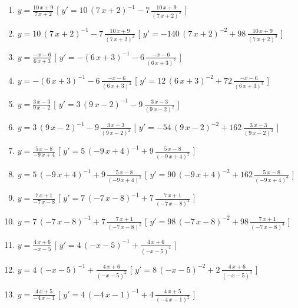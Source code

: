 \begin{esercizio}
\begin{enumerate}
\item $y= {\frac {10\,x+9}{7\,x+2}} $ \hfill [ $y'= 10\, \left( 7\,x+2 \right) ^{-1}-7\,{\frac {10\,x+9}{ \left( 7\,x+2 \right) ^{2}}}$ ]
\item $y= 10\, \left( 7\,x+2 \right) ^{-1}-7\,{\frac {10\,x+9}{ \left( 7\,x+2 \right) ^{2}}} $ \hfill [ $y'= -140\, \left( 7\,x+2 \right) ^{-2}+98\,{\frac {10\,x+9}{ \left( 7\,x+2 \right) ^{3}}}$ ]
\item $y= {\frac {-x-6}{6\,x+3}} $ \hfill [ $y'= - \left( 6\,x+3 \right) ^{-1}-6\,{\frac {-x-6}{ \left( 6\,x+3 \right) ^{2}}}$ ]
\item $y= - \left( 6\,x+3 \right) ^{-1}-6\,{\frac {-x-6}{ \left( 6\,x+3 \right) ^{2}}} $ \hfill [ $y'= 12\, \left( 6\,x+3 \right) ^{-2}+72\,{\frac {-x-6}{ \left( 6\,x+3 \right) ^{3}}}$ ]
\item $y= {\frac {3\,x-3}{9\,x-2}} $ \hfill [ $y'= 3\, \left( 9\,x-2 \right) ^{-1}-9\,{\frac {3\,x-3}{ \left( 9\,x-2 \right) ^{2}}}$ ]
\item $y= 3\, \left( 9\,x-2 \right) ^{-1}-9\,{\frac {3\,x-3}{ \left( 9\,x-2 \right) ^{2}}} $ \hfill [ $y'= -54\, \left( 9\,x-2 \right) ^{-2}+162\,{\frac {3\,x-3}{ \left( 9\,x-2 \right) ^{3}}}$ ]
\item $y= {\frac {5\,x-8}{-9\,x+4}} $ \hfill [ $y'= 5\, \left( -9\,x+4 \right) ^{-1}+9\,{\frac {5\,x-8}{ \left( -9\,x+4 \right) ^{2}}}$ ]
\item $y= 5\, \left( -9\,x+4 \right) ^{-1}+9\,{\frac {5\,x-8}{ \left( -9\,x+4 \right) ^{2}}} $ \hfill [ $y'= 90\, \left( -9\,x+4 \right) ^{-2}+162\,{\frac {5\,x-8}{ \left( -9\,x+4 \right) ^{3}}}$ ]
\item $y= {\frac {7\,x+1}{-7\,x-8}} $ \hfill [ $y'= 7\, \left( -7\,x-8 \right) ^{-1}+7\,{\frac {7\,x+1}{ \left( -7\,x-8 \right) ^{2}}}$ ]
\item $y= 7\, \left( -7\,x-8 \right) ^{-1}+7\,{\frac {7\,x+1}{ \left( -7\,x-8 \right) ^{2}}} $ \hfill [ $y'= 98\, \left( -7\,x-8 \right) ^{-2}+98\,{\frac {7\,x+1}{ \left( -7\,x-8 \right) ^{3}}}$ ]
\item $y= {\frac {4\,x+6}{-x-5}} $ \hfill [ $y'= 4\, \left( -x-5 \right) ^{-1}+{\frac {4\,x+6}{ \left( -x-5 \right) ^{2}}}$ ]
\item $y= 4\, \left( -x-5 \right) ^{-1}+{\frac {4\,x+6}{ \left( -x-5 \right) ^{2}}} $ \hfill [ $y'= 8\, \left( -x-5 \right) ^{-2}+2\,{\frac {4\,x+6}{ \left( -x-5 \right) ^{3}}}$ ]
\item $y= {\frac {4\,x+5}{-4\,x-1}} $ \hfill [ $y'= 4\, \left( -4\,x-1 \right) ^{-1}+4\,{\frac {4\,x+5}{ \left( -4\,x-1 \right) ^{2}}}$ ]

\end{enumerate}
\end{esercizio}
